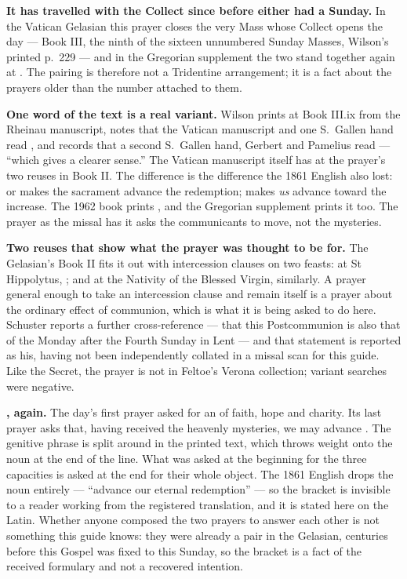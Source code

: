 \textbf{It has travelled with the Collect since before either had a Sunday.} In
the Vatican Gelasian this prayer closes the very Mass whose Collect opens the
day --- Book III, the ninth of the sixteen unnumbered Sunday Masses, Wilson's
printed p.~229 --- and in the Gregorian supplement the two stand together again
at . The pairing is therefore not a Tridentine
arrangement; it is a fact about the prayers older than the number attached to
them.

\textbf{One word of the text is a real variant.} Wilson prints
 at Book III.ix from the Rheinau manuscript, notes that the
Vatican manuscript and one S.\ Gallen hand read , and records
that a second S.\ Gallen hand, Gerbert and Pamelius read 
--- ``which gives a clearer sense.'' The Vatican manuscript itself has
 at the prayer's two reuses in Book II. The difference is
the difference the 1861 English also lost:  or
 makes the sacrament advance the redemption;
 makes \textit{us} advance toward the increase. The 1962
book prints , and the Gregorian supplement prints it too.
The prayer as the missal has it asks the communicants to move, not the
mysteries.

\textbf{Two reuses that show what the prayer was thought to be for.} The
Gelasian's Book II fits it out with intercession clauses on two feasts: at St
Hippolytus, ; and at the
Nativity of the Blessed Virgin, similarly. A prayer general enough to take an
intercession clause and remain itself is a prayer about the ordinary effect of
communion, which is what it is being asked to do here. Schuster reports a
further cross-reference --- that this Postcommunion is also that of the Monday
after the Fourth Sunday in Lent --- and that statement is reported as his,
having not been independently collated in a missal scan for this guide. Like
the Secret, the prayer is not in Feltoe's Verona collection; variant searches
were negative.

\textbf{, again.} The day's first prayer asked for an
 of faith, hope and charity. Its last prayer asks that, having
received the heavenly mysteries, we may advance . The genitive phrase is split around  in the
printed text, which throws weight onto the noun at the end of the line. What
was asked at the beginning for the three capacities is asked at the end for
their whole object. The 1861 English drops the noun entirely --- ``advance our
eternal redemption'' --- so the bracket is invisible to a reader working from
the registered translation, and it is stated here on the Latin. Whether anyone
composed the two prayers to answer each other is not something this guide
knows: they were already a pair in the Gelasian, centuries before this Gospel
was fixed to this Sunday, so the bracket is a fact of the received formulary
and not a recovered intention.
